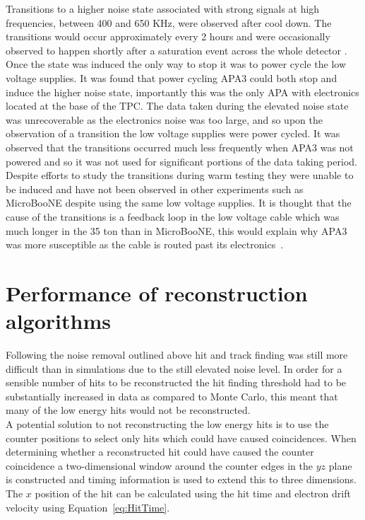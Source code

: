 Transitions to a higher noise state associated with strong signals at high frequencies, between 400 and 650 KHz, were observed after cool down. The transitions would occur approximately every 2 hours and were occasionally observed to happen shortly after a saturation event across the whole detector \citep{35tonNoiseMeeting}. Once the state was induced the only way to stop it was to power cycle the low voltage supplies. It was found that power cycling APA3 could both stop and induce the higher noise state, importantly this was the only APA with electronics located at the base of the TPC. The data taken during the elevated noise state was unrecoverable as the electronics noise was too large, and so upon the observation of a transition the low voltage supplies were power cycled. It was observed that the transitions occurred much less frequently when APA3 was not powered and so it was not used for significant portions of the data taking period. Despite efforts to study the transitions during warm testing they were unable to be induced and have not been observed in other experiments such as MicroBooNE despite using the same low voltage supplies. It is thought that the cause of the transitions is a feedback loop in the low voltage cable which was much longer in the 35 ton than in MicroBooNE, this would explain why APA3 was more susceptible as the cable is routed past its electronics~\citep{35tonNoiseDoc}.

\section{Performance of reconstruction algorithms} \label{sec:DataAlgs}  %
Following the noise removal outlined above hit and track finding was still more difficult than in simulations due to the still elevated noise level. In order for a sensible number of hits to be reconstructed the hit finding threshold had to be substantially increased in data as compared to Monte Carlo, this meant that many of the low energy hits would not be reconstructed. \\

A potential solution to not reconstructing the low energy hits is to use the counter positions to select only hits which could have caused coincidences. When determining whether a reconstructed hit could have caused the counter coincidence a two-dimensional window around the counter edges in the $yz$ plane is constructed and timing information is used to extend this to three dimensions.  The $x$ position of the hit can be calculated using the hit time and electron drift velocity using Equation~\ref{eq:HitTime}. \\

